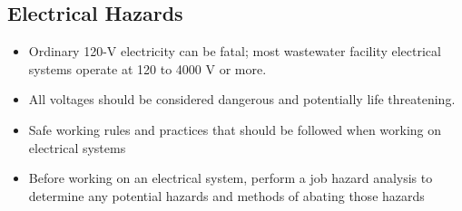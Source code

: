 \subsection{Electrical Hazards}
\begin{itemize}
\item Ordinary 120-V electricity can be fatal; most wastewater facility electrical systems operate at 120 to 4000 V or more.  
\item All voltages should be considered dangerous and potentially life threatening.  
\item Safe working rules and practices that should be followed when working on electrical systems
\item Before working on an electrical system, perform a job hazard analysis to determine any potential hazards and methods of abating those hazards
\end{itemize}


